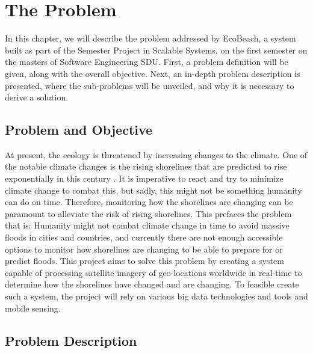 \chapter{The Problem} \label{ch:the-problem}

In this chapter, we will describe the problem addressed by EcoBeach, a system built as part of the Semester Project in Scalable Systems, on the first semester on the masters of Software Engineering SDU. \medbreak
\noindent
First, a problem definition will be given, along with the overall objective. Next, an in-depth problem description is presented, where the sub-problems will be unveiled, and why it is necessary to derive a solution.

\section{Problem and Objective}

At present, the ecology is threatened by increasing changes to the climate. One of the notable climate changes is the rising shorelines that are predicted to rise exponentially in this century . It is imperative to react and try to minimize climate change to combat this, but sadly, this might not be something humanity can do on time. Therefore, monitoring how the shorelines are changing can be paramount to alleviate the risk of rising shorelines. This prefaces the problem that is: \medbreak 
\noindent
Humanity might not combat climate change in time to avoid massive floods in cities and countries, and currently there are not enough accessible options to monitor how shorelines are changing to be able to prepare for or predict floods. \medbreak 
\noindent
This project aims to solve this problem by creating a system capable of processing satellite imagery of geo-locations worldwide in real-time to determine how the shorelines have changed and are changing. \medbreak 
\noindent
To feasible create such a system, the project will rely on various big data technologies and tools and mobile sensing.

\section{Problem Description} \label{sec:problem-description}


